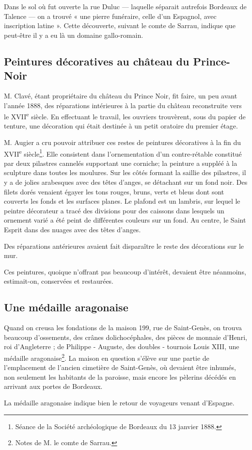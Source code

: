 \documentclass[a4paper,11pt]{book}
\begin{document}
Dans le sol où fut ouverte la rue Duluc — laquelle séparait autrefois Bordeaux de Talence — on a trouvé « une pierre funéraire, celle d'un Espagnol, avec inscription latine ». Cette découverte, suivant le comte de Sarrau, indique que peut-être il y a eu là un domaine gallo-romain.

\subsection{Peintures décoratives au château du Prince-Noir}

M. Clavé, étant propriétaire du château du Prince Noir, fit faire, un peu avant l'année 1888, des réparations intérieures à la partie du château reconstruite vers le XVII\textsuperscript{e} siècle. En effectuant le travail, les ouvriers trouvèrent, sous du papier de tenture, une décoration qui était destinée à un petit oratoire du premier étage.

M. Augier a cru pouvoir attribuer ces restes de peintures
décoratives à la fin du XVII\textsuperscript{e} siècle\footnote{Séance de la Société archéologique de Bordeaux du 13 janvier 1888.}. Elle consistent dans l'ornementation d'un contre-rétable constitué par deux pilastres cannelés supportant une corniche; la peinture a suppléé à la sculpture dans toutes les moulures. Sur les côtés formant la saillie des pilastres, il y a de jolies arabesques avec des têtes d'anges, se détachant sur un fond noir. Des filets dorés venaient égayer les tons rouges, bruns, verts et bleus dont sont couverts les fonds et les surfaces planes. Le plafond est un lambris, sur lequel le peintre décorateur a tracé des divisions pour des caissons dans lesquels un ornement varié a été peint de différentes couleurs sur un fond. Au centre, le Saint Esprit dans des nuages avec des têtes d'anges.

Des réparations antérieures avaient fait disparaître le reste des décorations sur le mur.

Ces peintures, quoique n'offrant pas beaucoup d'intérêt, devaient être néanmoins, estimait-on, conservées et restaurées.

\subsection{Une médaille aragonaise}

Quand on creusa les fondations de la maison 199, rue de Saint-Genès, on trouva beaucoup d'ossements, des crânes dolichocéphales, des pièces de monnaie d'Henri, roi d'Angleterre ; de Philippe - Auguste, des doubles - tournois Louis XIII, une médaille aragonaise\footnote{Notes de M. le comte de Sarrau.}. La maison en question s'élève sur une partie de l'emplacement de l'ancien cimetière de Saint-Genès, où devaient être inhumés, non seulement les habitants de la paroisse, mais encore les pèlerins décédés en arrivant aux portes de Bordeaux.

La médaille aragonaise indique bien le retour de voyageurs venant d'Espagne.
        
\end{document}
